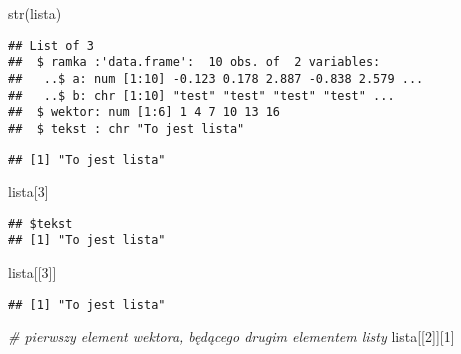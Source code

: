 \documentclass[
]{book}
\newenvironment{Shaded}{\begin{snugshade}}{\end{snugshade}}
\newcommand{\CommentTok}[1]{\textcolor[rgb]{0.56,0.35,0.01}{\textit{#1}}}
\newcommand{\DecValTok}[1]{\textcolor[rgb]{0.00,0.00,0.81}{#1}}
\newcommand{\FunctionTok}[1]{\textcolor[rgb]{0.00,0.00,0.00}{#1}}
\newcommand{\NormalTok}[1]{#1}
\newcommand{\SpecialCharTok}[1]{\textcolor[rgb]{0.00,0.00,0.00}{#1}}
\begin{document}
\begin{Shaded}
\begin{Highlighting}[]
\FunctionTok{str}\NormalTok{(lista)}
\end{Highlighting}
\end{Shaded}

\begin{verbatim}
## List of 3
##  $ ramka :'data.frame':  10 obs. of  2 variables:
##   ..$ a: num [1:10] -0.123 0.178 2.887 -0.838 2.579 ...
##   ..$ b: chr [1:10] "test" "test" "test" "test" ...
##  $ wektor: num [1:6] 1 4 7 10 13 16
##  $ tekst : chr "To jest lista"
\end{verbatim}

\begin{Shaded}
\end{Shaded}

\begin{verbatim}
## [1] "To jest lista"
\end{verbatim}

\begin{Shaded}
\begin{Highlighting}[]
\NormalTok{lista[}\DecValTok{3}\NormalTok{]}
\end{Highlighting}
\end{Shaded}

\begin{verbatim}
## $tekst
## [1] "To jest lista"
\end{verbatim}

\begin{Shaded}
\begin{Highlighting}[]
\NormalTok{lista[[}\DecValTok{3}\NormalTok{]]}
\end{Highlighting}
\end{Shaded}

\begin{verbatim}
## [1] "To jest lista"
\end{verbatim}

\begin{Shaded}
\begin{Highlighting}[]
\CommentTok{\# pierwszy element wektora, będącego drugim elementem listy}
\NormalTok{lista[[}\DecValTok{2}\NormalTok{]][}\DecValTok{1}\NormalTok{]}
\end{Highlighting}
\end{Shaded}
\end{document}
